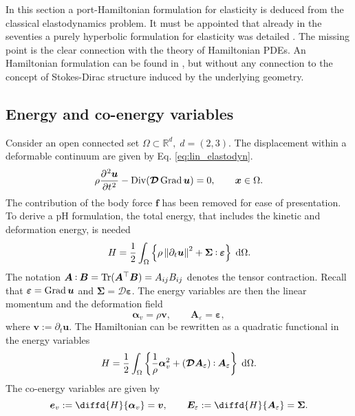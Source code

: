 In this section a port-Hamiltonian formulation for elasticity is deduced from the classical elastodynamics problem. It must be appointed that already in the seventies a purely hyperbolic formulation for elasticity was detailed \cite{hughes1978classical}. The missing point is the clear connection with the theory of Hamiltonian PDEs. An Hamiltonian formulation can be found in \cite[Chapter 16]{grinfield2015}, but without any connection to the concept of Stokes-Dirac structure induced by the underlying geometry. \\

\subsection{Energy and co-energy variables}
Consider an open connected set $\Omega \subset \mathbb{R}^d, \; d=(2,3)$. The displacement within a deformable continuum are given by Eq. \eqref{eq:lin_elastodyn}. 
\begin{equation}
\rho \diffp[2]{\bm{u}}{t} - \Div(\bm{\mathcal{D}} \Grad \bm{u}) =0, \qquad \bm{x} \in \Omega.
\end{equation}
The contribution of the body force $\bm{f}$ has been removed for ease of presentation. To derive a pH formulation, the total energy, that includes the kinetic and  deformation energy, is needed
\begin{equation}
	H = \energy{\rho \norm{\partial_t \bm{u}}^2 + \bm{\Sigma} \cddot \bm{\varepsilon}}.
\end{equation}
The notation $\bm{A}\cddot \bm{B} = \Tr(\bm{A}^\top\bm{B}) = A_{ij} B_{ij}$ denotes the tensor contraction. Recall that $\bm{\varepsilon}= \operatorname*{Grad}{\bm{u}}$ and $\bm{\Sigma}=\bm{\mathcal{D}}\bm{\varepsilon}$. The energy variables are then the linear momentum and the deformation field
\[
\bm{\alpha}_v = \rho \bm{v}, \qquad \bm{A}_{\varepsilon} = \bm{\varepsilon},
\]
where $\bm{v}:= \partial_t \bm{u}$. The Hamiltonian can be rewritten as a quadratic functional in the energy variables
\begin{equation}
H = \energy{\frac{1}{\rho} \bm{\alpha}_v^2 + (\bm{\mathcal{D}} \bm{A}_{\varepsilon}) \cddot  \bm{A}_{\varepsilon}}.
\end{equation}
The co-energy variables are given by
\begin{equation}
\bm{e}_v := \diffd{H}{\bm{\alpha}_v} = \bm{v}, \qquad \bm{E}_\varepsilon := \diffd{H}{\bm{A}_{\varepsilon}} = \bm{\Sigma}.
\end{equation}  

